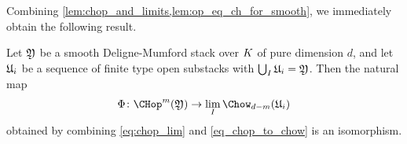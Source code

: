 Combining \cref{lem:chop_and_limits,lem:op_eq_ch_for_smooth}, we immediately obtain the following
result.
\begin{corollary}
\notready
Let $\frak Y$ be a smooth Deligne-Mumford stack over ${K}$ of pure dimension $d$, and let $\frak U_i$ be a sequence of finite type open substacks with $\bigcup_I \frak U_i = \frak Y$. Then the natural map
\begin{equation}
\Phi\colon \CHop^m(\frak Y) \to \lim_I \Chow_{d-m}(\frak U_i)
\end{equation}
obtained by combining \eqref{eq:chop_lim} and \eqref{eq_chop_to_chow} is an isomorphism.
\end{corollary}

